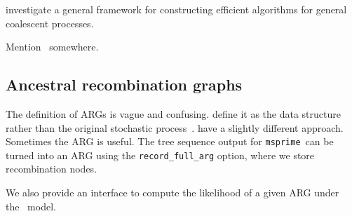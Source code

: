 \documentclass{article}
\newcommand{\msprime}[0]{\texttt{msprime}}
\newcommand{\msprime}[0]{{\texttt{msprime} }}
\newcommand{\IN}{\ensuremath{\mathds{N}}}%
\newcommand{\one}[1]{\ensuremath{\mathds{1}_{\left\{ #1 \right\}}}}%
\begin{document}
\cite{Becheler2020}  investigate a general framework for  constructing efficient algorithms for general  coalescent processes.   


\begin{comment}%
A coalescent process is a continuous-time Markov process taking values among the
partitions of $\IN := \{1,2, \ldots \}$, such that the restriction to
any finite $n \in \IN $ takes values among partitions of
$[n] := \{1, 2, \ldots, n\}$.  Write $\one{A} = 1$ if $A$ holds, and zero otherwise.   Let $\cP_n$ denote the set of
partitions of $[n]$.  In the classical Kingman-coalescent, the only
possible transitions are the mergers of pairs of blocks (elements of a
partition $\pi \in \cP_n$), one pair at a time.  The $n$ leaves
(corresponding to the sampled DNA sequences) are arbitrarily labelled
from 1 to $n$, and  the blocks of a partition represent the common ancestors
of the labels of each block.    The initial state is  (usually) taken as 
$\{ \{1\}, \ldots, \{n\}\}$, and the final state, i.e.\ when the most 
recent common ancester is reached, as $\{ [n]\}$. A block in a partition of
$[n]$ represents an ancestor of the leaves in the block, i.e.\ the block
$\{i_1, \ldots, i_k\}$ in a given partition of $[n]$ is an ancestor of the
$k$ leaves $i_1, \ldots, i_k \in [n]$, and the leaves  correspond to
arbitrarily labelled DNA sequences in the sample.  
\end{comment}



Mention~\citep{becheler2020occupancy} somewhere.

\subsection*{Ancestral recombination graphs}
The definition of ARGs is vague and confusing.
\cite{minichiello2006mapping} define it as the data structure
rather than the original stochastic
process~\citep{griffiths1991two,griffiths1997ancestral}.
\cite{rasmussen2014genome} have a slightly different approach.
Sometimes the ARG is useful.
The tree sequence output for \msprime\ can be turned into
an ARG using the \texttt{record\_full\_arg} option, where we store
recombination nodes.

We also provide an interface to compute the likelihood of a given ARG
under the~\cite{kuhner2000maximum} model.
\end{document}
